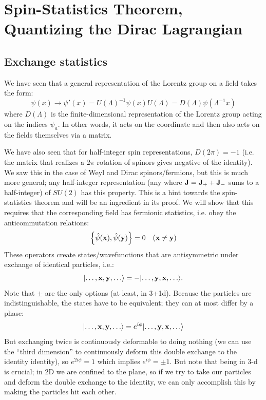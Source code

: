 \section{Spin-Statistics Theorem, Quantizing the Dirac Lagrangian}
\subsection{Exchange statistics}
We have seen that a general representation of the Lorentz group on a field takes the form:
\begin{equation}
    \psi(x) \to \psi'(x) = U(\Lambda)^{-1}\psi(x)U(\Lambda) = D(\Lambda)\psi(\Lambda^{-1}x)
\end{equation}
where $D(\Lambda)$ is the finite-dimensional representation of the Lorentz group acting on the indices $\psi_a$. In other words, it acts on the coordinate and then also acts on the fields themselves via a matrix.

We have also seen that for half-integer spin representations, $D(2\pi) = -1$ (i.e. the matrix that realizes a $2\pi$ rotation of spinors gives negative of the identity). We saw this in the case of Weyl and Dirac spinors/fermions, but this is much more general; any half-integer representation (any where $\mathbf{J} = \mathbf{J}_+ + \mathbf{J}_-$ sums to a half-integer) of $SU(2)$ has this property. This is a hint towards the spin-statistics theorem and will be an ingredient in its proof. We will show that this requires that the corresponding field has fermionic statistics, i.e. obey the anticommutation relations:
\begin{equation}
    \set{\hat{\psi}(\ensuremath{\mathbf{x}}), \hat{\psi}(\ensuremath{\mathbf{y}})} = 0 \quad (\mathbf{x} \neq \mathbf{y})
\end{equation}
These operators create states/wavefunctions that are antisymmetric under exchange of identical particles, i.e.:
\begin{equation}
    \lvert \ldots, \mathbf{x}, \mathbf{y}, \ldots \rangle = -\lvert \ldots, \mathbf{y}, \mathbf{x}, \ldots \rangle.
\end{equation}
Note that $\pm$ are the only options (at least, in 3+1d). Because the particles are indistinguishable, the states have to be equivalent; they can at most differ by a phase:
\begin{equation}
    \lvert \ldots, \mathbf{x},\mathbf{y}, \ldots \rangle = e^{i\phi}\lvert \ldots, \mathbf{y}, \mathbf{x}, \ldots \rangle
\end{equation}
But exchanging twice is continuously deformable to doing nothing (we can use the ``third dimension'' to continuously deform this double exchange to the identity identity), so $e^{2i\phi} = 1$ which implies $e^{i\phi} = \pm 1$. But note that being in 3-d is crucial; in 2D we are confined to the plane, so if we try to take our particles and deform the double exchange to the identity, we can only accomplish this by making the particles hit each other. 

